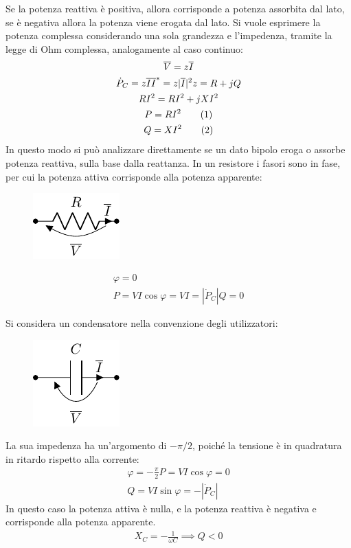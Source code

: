 \documentclass{article}
\newcommand{\tageq}{\tag{\stepcounter{equation}\theequation}}
\numberwithin{equation}{subsection}
\begin{document}
Se la potenza reattiva è positiva, allora corrisponde a potenza assorbita dal lato, se è negativa allora la potenza viene erogata dal lato. Si vuole esprimere la 
potenza complessa considerando una sola grandezza e l'impedenza, tramite la legge di Ohm complessa, analogamente al caso continuo:
\begin{gather*}
    \overline{V}=z\overline{I}\\
    \dot P_C=z\overline{I}\overline{I}^*=z|\overline{I}|^2
    z=R+jQ\\
    RI^2=RI^2+jXI^2\\
    P=RI^2\tageq\\
    Q=XI^2\tageq
\end{gather*}
In questo modo si può analizzare direttamente se un dato bipolo eroga o assorbe potenza reattiva, sulla base dalla reattanza. 
In un resistore i fasori sono in fase, per cui la potenza attiva corrisponde alla potenza apparente:
\begin{figure}[H]%
    \centering
    \includegraphics{resistore-fasori.pdf}%
\end{figure}
\begin{gather*}
    \varphi=0\\
    P=VI\cos\varphi=VI=|\dot P_C|
    Q=0
\end{gather*}

Si considera un condensatore nella convenzione degli utilizzatori: 
\begin{figure}[H]%
    \centering
    \includegraphics{condensatore-fasori.pdf}%
\end{figure}

La sua impedenza ha un'argomento di $-\pi/2$, poiché la tensione è in quadratura in ritardo rispetto alla corrente:
\begin{gather*}
    \varphi=\displaystyle-\frac{\pi}{2}
    P=VI\cos\varphi=0\\
    Q=VI\sin\varphi=-|\dot P_C|
\end{gather*}
In questo caso la potenza attiva è nulla, e la potenza reattiva è negativa e corrisponde alla potenza apparente. 
\begin{gather*}
    X_C=\displaystyle-\frac{1}{\omega C}\implies Q<0
\end{gather*} 
\end{document}
